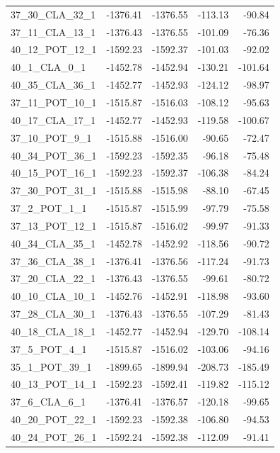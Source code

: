 \documentclass[journal=jacsat,manuscript=article]{achemso}
\begin{document}
\begin{table}[b!]
\begin{tabular}{lrrrr}
37\_30\_CLA\_32\_1 &  -1376.41 &  -1376.55 & -113.13 &  -90.84 \\
37\_11\_CLA\_13\_1 &  -1376.43 &  -1376.55 & -101.09 &  -76.36 \\
40\_12\_POT\_12\_1 &  -1592.23 &  -1592.37 & -101.03 &  -92.02 \\
40\_1\_CLA\_0\_1   &  -1452.78 &  -1452.94 & -130.21 & -101.64 \\
40\_35\_CLA\_36\_1 &  -1452.77 &  -1452.93 & -124.12 &  -98.97 \\
37\_11\_POT\_10\_1 &  -1515.87 &  -1516.03 & -108.12 &  -95.63 \\
40\_17\_CLA\_17\_1 &  -1452.77 &  -1452.93 & -119.58 & -100.67 \\
37\_10\_POT\_9\_1  &  -1515.88 &  -1516.00 &  -90.65 &  -72.47 \\
40\_34\_POT\_36\_1 &  -1592.23 &  -1592.35 &  -96.18 &  -75.48 \\
40\_15\_POT\_16\_1 &  -1592.23 &  -1592.37 & -106.38 &  -84.24 \\
37\_30\_POT\_31\_1 &  -1515.88 &  -1515.98 &  -88.10 &  -67.45 \\
37\_2\_POT\_1\_1   &  -1515.87 &  -1515.99 &  -97.79 &  -75.58 \\
37\_13\_POT\_12\_1 &  -1515.87 &  -1516.02 &  -99.97 &  -91.33 \\
40\_34\_CLA\_35\_1 &  -1452.78 &  -1452.92 & -118.56 &  -90.72 \\
37\_36\_CLA\_38\_1 &  -1376.41 &  -1376.56 & -117.24 &  -91.73 \\
37\_20\_CLA\_22\_1 &  -1376.43 &  -1376.55 &  -99.61 &  -80.72 \\
40\_10\_CLA\_10\_1 &  -1452.76 &  -1452.91 & -118.98 &  -93.60 \\
37\_28\_CLA\_30\_1 &  -1376.43 &  -1376.55 & -107.29 &  -81.43 \\
40\_18\_CLA\_18\_1 &  -1452.77 &  -1452.94 & -129.70 & -108.14 \\
37\_5\_POT\_4\_1   &  -1515.87 &  -1516.02 & -103.06 &  -94.16 \\
35\_1\_POT\_39\_1  &  -1899.65 &  -1899.94 & -208.73 & -185.49 \\
40\_13\_POT\_14\_1 &  -1592.23 &  -1592.41 & -119.82 & -115.12 \\
37\_6\_CLA\_6\_1   &  -1376.41 &  -1376.57 & -120.18 &  -99.65 \\
40\_20\_POT\_22\_1 &  -1592.23 &  -1592.38 & -106.80 &  -94.53 \\
40\_24\_POT\_26\_1 &  -1592.24 &  -1592.38 & -112.09 &  -91.41 \\

\end{tabular}
\end{table}
\end{document}
